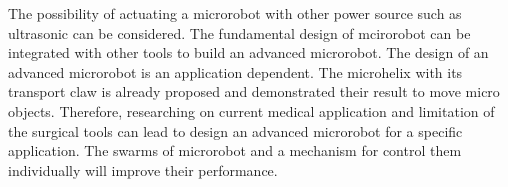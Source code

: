 \documentclass[12pt,a4paper,titlepage]{report}
\begin{document}
The possibility of actuating a microrobot with other power source such as ultrasonic can be
 considered. The fundamental design of mcirorobot can be integrated with other tools to build 
an advanced microrobot. The design of an advanced microrobot is an application dependent. 
The microhelix with its transport claw is already proposed and demonstrated their result to move 
micro objects. Therefore, researching on current medical application and limitation of the surgical
 tools can lead to design an advanced microrobot for a specific application. The swarms of 
microrobot and a mechanism for control them individually will improve their performance.      










\nocite{lauga2006swimming}




%
 
\end{document}
